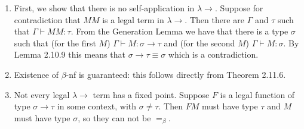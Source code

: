 \documentclass[letterpaper]{article}
\newcommand{\beq}{=_\beta}
\newcommand{\bnf}{$\beta$-nf\xspace}
\newcommand{\larr}{\lambda \!\! \rightarrow}
\begin{document}
\begin{enumerate}
	\item First, we show that there is no self-application in $\larr$. Suppose for contradiction that $MM$ is a legal term in $\larr$. Then there are $\Gamma$ and $\tau$ such that $\Gamma \vdash M M : \tau$. From the Generation Lemma we have that there is a type $\sigma$ such that (for the first $M$) $\Gamma \vdash M : \sigma \to \tau$ and (for the second $M$) $\Gamma \vdash M : \sigma$. By Lemma 2.10.9 this means that $\sigma \to \tau \equiv \sigma$ which is a contradiction.
	
	\item Existence of \bnf is guaranteed: this follows directly from Theorem 2.11.6.
	
	\item Not every legal $\larr$ term has a fixed point. Suppose $F$ is a legal function of type $\sigma \to \tau$ in some context, with $\sigma \neq \tau$. Then $FM$ must have type $\tau$ and $M$ must have type $\sigma$, so they can not be $\beq$.
\end{enumerate}






\end{document}
